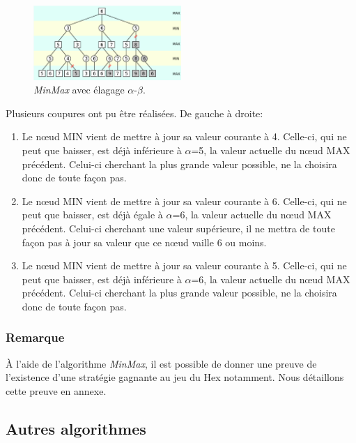 \begin{figure}[h]
    \begin{center}
        \includegraphics[width=0.5\textwidth]{root/minmax_alpha_beta.png}
    \end{center}
    \caption{\emph{MinMax} avec élagage $\alpha$-$\beta$.}\label{fig:min_max_alpha_beta}
\end{figure}


Plusieurs coupures ont pu être réalisées. De gauche à droite:
\begin{enumerate}
    \item Le nœud MIN vient de mettre à jour sa valeur courante à 4. Celle-ci, qui ne peut que baisser, est déjà inférieure à $\alpha$=5, 
    la valeur actuelle du nœud MAX précédent. Celui-ci cherchant la plus grande valeur possible, ne la choisira donc de toute façon pas.
    \item Le nœud MIN vient de mettre à jour sa valeur courante à 6. Celle-ci, qui ne peut que baisser, est déjà égale à $\alpha$=6, la valeur 
    actuelle du nœud MAX précédent. Celui-ci cherchant une valeur supérieure, il ne mettra de toute façon pas à jour sa valeur que ce nœud 
    vaille 6 ou moins.
    \item Le nœud MIN vient de mettre à jour sa valeur courante à 5. Celle-ci, qui ne peut que baisser, est déjà inférieure à $\alpha$=6, la valeur 
    actuelle du nœud MAX précédent. Celui-ci cherchant la plus grande valeur possible, ne la choisira donc de toute façon pas.
\end{enumerate}

\subsubsection{Remarque}
À l'aide de l'algorithme \emph{MinMax}, il est possible de donner une preuve de l'existence d'une stratégie gagnante au jeu du Hex notamment. Nous détaillons
cette preuve en annexe.

\subsection{Autres algorithmes}
